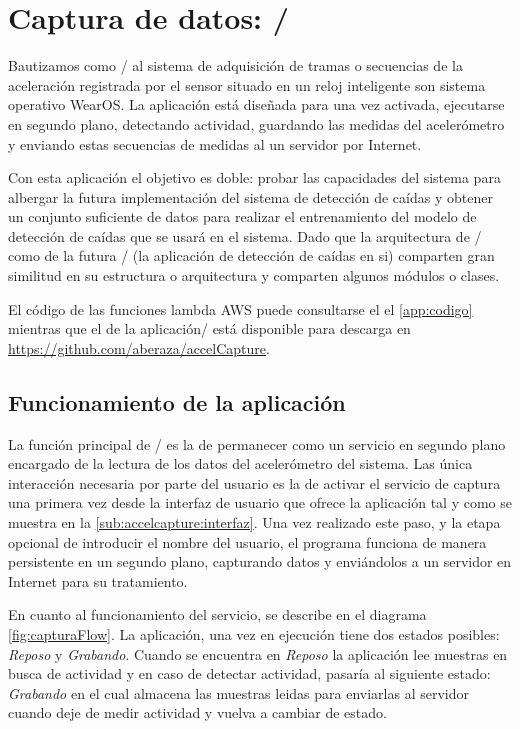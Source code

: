 \section{Captura de datos: \accelcapture/}\label{sec:imp:accelcapture}

Bautizamos como \accelcapture/ al sistema de adquisición de tramas o secuencias de la aceleración registrada por el sensor situado en un reloj inteligente son sistema operativo WearOS. La aplicación está diseñada para una vez activada, ejecutarse en segundo plano, detectando actividad, guardando las medidas del acelerómetro y enviando estas secuencias de medidas al un servidor por Internet.

Con esta aplicación el objetivo es doble: probar las capacidades del sistema para albergar la futura implementación del sistema de detección de caídas y obtener un conjunto suficiente de datos para realizar el entrenamiento del modelo de detección de caídas que se usará en el sistema. Dado que la arquitectura de \accelcapture/ como de la futura \ifell/ (la aplicación de detección de caídas en si) comparten gran similitud en su estructura o arquitectura y comparten algunos módulos o clases.

El código de las funciones lambda AWS puede consultarse el el \autoref{app:codigo} mientras que el de la aplicación\accelcapture/ está disponible para descarga en \url{https://github.com/aberaza/accelCapture}.

\subsection{Funcionamiento de la aplicación}\label{sub:accelcapture:flujo}

La función principal de \accelcapture/ es la de permanecer como un servicio en segundo plano encargado de la lectura de los datos del acelerómetro del sistema. Las única interacción necesaria por parte del usuario es la de activar el servicio de captura una primera vez desde la interfaz de usuario que ofrece la aplicación tal y como se muestra en la \autoref{sub:accelcapture:interfaz}. Una vez realizado este paso, y la etapa opcional de introducir el nombre del usuario, el programa funciona de manera persistente en un segundo plano, capturando datos y enviándolos a un servidor en Internet para su tratamiento.

En cuanto al funcionamiento del servicio, se describe en el diagrama \ref{fig:capturaFlow}. La aplicación, una vez en ejecución tiene dos estados posibles: \textit{Reposo} y \textit{Grabando}. Cuando se encuentra en \textit{Reposo} la aplicación lee muestras en busca de actividad y en caso de detectar actividad, pasaría al siguiente estado: \textit{Grabando} en el cual almacena las muestras leidas para enviarlas al servidor cuando deje de medir actividad y vuelva a cambiar de estado.

